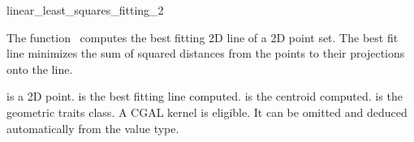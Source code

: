 
\begin{ccRefFunction}{linear_least_squares_fitting_2}  


\ccDefinition
  
The function \ccRefName\ computes the best fitting 2D line of a 2D
point set. The best fit line minimizes the sum of squared distances
from the points to their projections onto the line.


  { is a 2D point. 
    is the best fitting line computed. 
    is the centroid computed.
    is the geometric traits class. A CGAL kernel is eligible.
           It can be omitted and deduced automatically from the value type.
  \ccSeeAlso
  }


\end{ccRefFunction}
